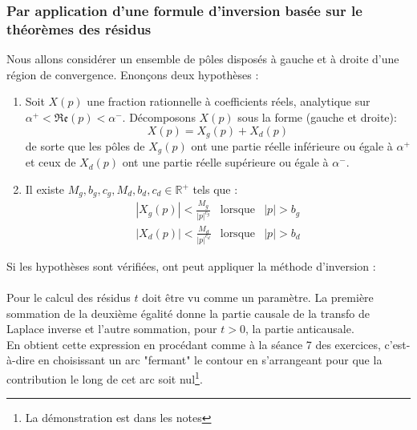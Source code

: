 		\subsubsection{Par application d'une formule d'inversion basée sur le théorèmes des 
		résidus}
		Nous allons considérer un ensemble de pôles disposés à gauche et à droite d'une région
		de convergence. Enonçons deux hypothèses : 
		\begin{enumerate}
		\item Soit $X(p)$ une fraction rationnelle à coefficients réels, analytique sur $\alpha^+ <
		\mathfrak{Re}(p) < \alpha^-$. Décomposons $X(p)$ sous la forme (gauche et droite):
		\begin{equation}
		X(p) = X_g(p) +X_d(p)
		\end{equation}
		de sorte que les pôles de $X_g(p)$ ont une partie réelle inférieure ou égale à $\alpha^+$ 
		et ceux de $X_d(p)$ ont une partie réelle supérieure ou égale à $\alpha^-$.
		\item Il existe $M_g, b_g, c_g,M_d, b_d, c_d \in \mathbb{R}^+$ tels que :
		\begin{equation}
		\begin{array}{lll}
		|X_g(p)| < \frac{M_g}{|p|^{c_g}} & \text{lorsque} & |p| > b_g\\
		|X_d(p)| < \frac{M_d}{|p|^{c_d}} & \text{lorsque} & |p| > b_d
		\end{array}
		\end{equation}
		\end{enumerate}
		Si les hypothèses sont vérifiées, ont peut appliquer la méthode d'inversion :\\
		
		\ \\
		
		Pour le calcul des résidus $t$ doit être vu comme un paramètre.  La première sommation de 
		la deuxième égalité donne la partie causale de la transfo de Laplace inverse et l'autre 
		sommation, pour $t > 0$, la partie anticausale.\\
		En obtient cette expression en procédant comme à la séance 7 des exercices, c'est-à-dire en
		choisissant un arc "fermant" le contour en s'arrangeant pour que la contribution le long de
		cet arc soit nul\footnote{La démonstration est dans les notes}.\\
		
